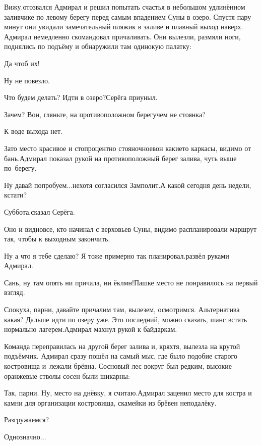 \diagdash Вижу.\mdash отозвался Адмирал и решил попытать счастья в небольшом удлинённом заливчике по левому берегу перед самым впадением Суны в озеро. Спустя пару минут они увидали замечательный пляжик в заливе и плавный выход наверх. Адмирал немедленно скомандовал причаливать. Они вылезли, размяли ноги, поднялись по подъёму и обнаружили там одинокую палатку:

\diagdash Да чтоб их!

\diagdash Ну не повезло.

\diagdash Что будем делать? Идти в озеро?\mdash Серёга приуныл.

\diagdash Зачем? Вон, гляньте, на противоположном берегу\mdash чем не стоянка? 

\diagdash К воде выхода нет.

\diagdash Зато место красивое и стопроцентно стояночное\mdash вон какие\sdash то каркасы, видимо от бань.\mdash Адмирал показал рукой на противоположный берег залива, чуть выше по~берегу.

\diagdash Ну давай попробуем$\ldots$\mdash нехотя согласился Замполит.\mdash А какой сегодня день недели, кстати?

\diagdash Суббота.\mdash сказал Серёга.

\diagdash Оно и видно\mdash все, кто начинал с верховьев Суны, видимо распланировали маршрут так, чтобы к выходным закончить.

\diagdash Ну а что я тебе сделаю? Я тоже примерно так планировал.\mdash развёл руками Адмирал.

\diagdash Сань, ну там опять ни причала, ни ёклмн!\mdash Пашке место не понравилось на первый взгляд.

\diagdash Спокуха, парни, давайте причалим там, вылезем, осмотримся. Альтернатива какая? Дальше идти по озеру уже. Это последний, можно сказать, шанс встать нормально лагерем.\mdash Адмирал махнул рукой к байдаркам.

Команда переправилась на другой берег залива и, кряхтя, вылезла на крутой подъёмчик. Адмирал сразу пошёл на самый мыс, где было подобие старого костровища и~лежали брёвна. Сосновый лес вокруг был редким, высокие оранжевые стволы сосен были шикарны:

\diagdash Так, парни. Ну, место на днёвку, я считаю.\mdash Адмирал заценил место для костра и камни для организации костровища, скамейки из брёвен неподалёку.

\diagdash Разгружаемся?

\diagdash Однозначно$\ldots$

